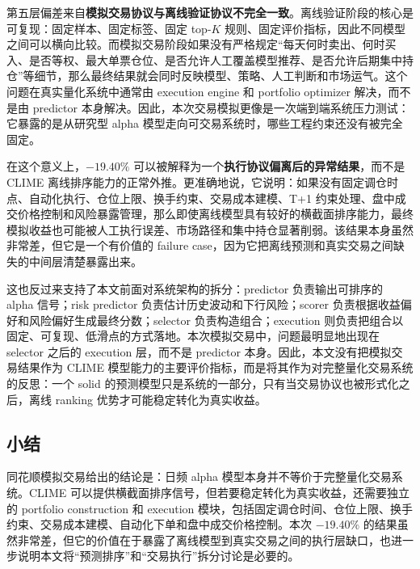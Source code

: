 第五层偏差来自\textbf{模拟交易协议与离线验证协议不完全一致}。离线验证阶段的核心是可复现：固定样本、固定标签、固定 top-$K$ 规则、固定评价指标，因此不同模型之间可以横向比较。而模拟交易阶段如果没有严格规定“每天何时卖出、何时买入、是否等权、最大单票仓位、是否允许人工覆盖模型推荐、是否允许后期集中持仓”等细节，那么最终结果就会同时反映模型、策略、人工判断和市场运气。这个问题在真实量化系统中通常由 execution engine 和 portfolio optimizer 解决，而不是由 predictor 本身解决。因此，本次交易模拟更像是一次端到端系统压力测试：它暴露的是从研究型 alpha 模型走向可交易系统时，哪些工程约束还没有被完全固定。

在这个意义上，$-19.40\%$ 可以被解释为一个\textbf{执行协议偏离后的异常结果}，而不是 CLIME 离线排序能力的正常外推。更准确地说，它说明：如果没有固定调仓时点、自动化执行、仓位上限、换手约束、交易成本建模、T+1 约束处理、盘中成交价格控制和风险暴露管理，那么即使离线模型具有较好的横截面排序能力，最终模拟收益也可能被人工执行误差、市场路径和集中持仓显著削弱。该结果本身虽然非常差，但它是一个有价值的 failure case，因为它把离线预测和真实交易之间缺失的中间层清楚暴露出来。

这也反过来支持了本文前面对系统架构的拆分：predictor 负责输出可排序的 alpha 信号；risk predictor 负责估计历史波动和下行风险；scorer 负责根据收益偏好和风险偏好生成最终分数；selector 负责构造组合；execution 则负责把组合以固定、可复现、低滑点的方式落地。本次模拟交易中，问题最明显地出现在 selector 之后的 execution 层，而不是 predictor 本身。因此，本文没有把模拟交易结果作为 CLIME 模型能力的主要评价指标，而是将其作为对完整量化交易系统的反思：一个 solid 的预测模型只是系统的一部分，只有当交易协议也被形式化之后，离线 ranking 优势才可能稳定转化为真实收益。

\subsection{小结}

同花顺模拟交易给出的结论是：日频 alpha 模型本身并不等价于完整量化交易系统。CLIME 可以提供横截面排序信号，但若要稳定转化为真实收益，还需要独立的 portfolio construction 和 execution 模块，包括固定调仓时间、仓位上限、换手约束、交易成本建模、自动化下单和盘中成交价格控制。本次 $-19.40\%$ 的结果虽然非常差，但它的价值在于暴露了离线模型到真实交易之间的执行层缺口，也进一步说明本文将“预测排序”和“交易执行”拆分讨论是必要的。

\clearpage

